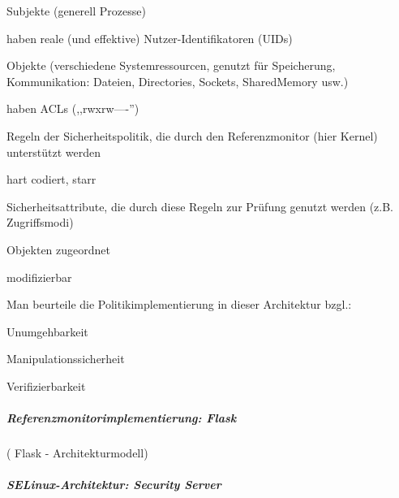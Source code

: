 \documentclass[a4paper]{article}
\begin{document}
\begin{multicols}{3}
    \begin{itemize*}
        \item
        Subjekte (generell Prozesse)
        \begin{itemize*}
            \item haben reale (und effektive) Nutzer-Identifikatoren (UIDs)
        \end{itemize*}
        \item
        Objekte (verschiedene Systemressourcen, genutzt für Speicherung,
        Kommunikation: Dateien, Directories, Sockets, SharedMemory usw.)
        \begin{itemize*}
            \item haben ACLs (,,rwxrw----'')
        \end{itemize*}
        \item
        Regeln der Sicherheitspolitik, die durch den Referenzmonitor (hier
        Kernel) unterstützt werden
        \begin{itemize*}
            \item hart codiert, starr
        \end{itemize*}
        \item
        Sicherheitsattribute, die durch diese Regeln zur Prüfung genutzt
        werden (z.B. Zugriffsmodi)
        \begin{itemize*}
            \item Objekten zugeordnet
            \item modifizierbar
        \end{itemize*}
    \end{itemize*}

    Man beurteile die Politikimplementierung in dieser Architektur bzgl.:

    \begin{itemize*}
        \item
        Unumgehbarkeit
        \item
        Manipulationssicherheit
        \item
        Verifizierbarkeit
    \end{itemize*}


    \subparagraph{Referenzmonitorimplementierung:
        Flask}

    ( Flask - Architekturmodell)



    \subparagraph{SELinux-Architektur: Security
        Server}


\end{multicols}
\end{document}
